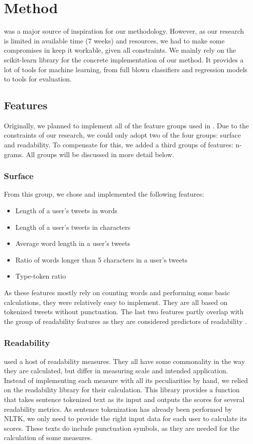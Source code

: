 \documentclass[
10pt, %
a4paper, %
oneside, %
headinclude,footinclude, %
] {book}%
\begin{document}
\chapter{Method}
\citet{flekova} was a major source of inspiration for our methodology. However, as our research is limited in available time (7 weeks) and resources, we had to make some compromises in keep it workable, given all constraints. We mainly rely on the scikit-learn library \citep{sklearn} for the concrete implementation of our method. It provides a lot of tools for machine learning, from full blown classifiers and regression models to tools for evaluation. 

\section{Features}
Originally, we planned to implement all of the feature groups used in \citet{flekova}. Due to the constraints of our research, we could only adopt two of the four groups: surface and readability. To compensate for this, we added a third groups of features: n-grams. All groups will be discussed in more detail below.

\subsection{Surface}
From this group, we chose and implemented the following features:
\begin{itemize}
\item Length of a user's tweets in words
\item Length of a user's tweets in characters
\item Average word length in a user's tweets
\item Ratio of words longer than 5 characters in a user's tweets
\item Type-token ratio
\end{itemize}

As these features mostly rely on counting words and performing some basic calculations, they were relatively easy to implement. They are all based on tokenized tweets without punctuation. The last two features partly overlap with the group of readability features as they are considered predictors of readability \citep{flekova}.

\subsection{Readability}
\citet{flekova} used a host of readability measures. They all have some commonality in the way they are calculated, but differ in measuring scale and intended application. Instead of implementing each measure with all its peculiarities by hand, we relied on the readability library \citep{readability} for their calculation. This library provides a function that takes sentence tokenized text as its input and outputs the scores for several readability metrics. As sentence tokenization has already been performed by NLTK, we only need to provide the right input data for each user to calculate its scores. These texts do include punctuation symbols, as they are needed for the calculation of some measures.
\end{document}
